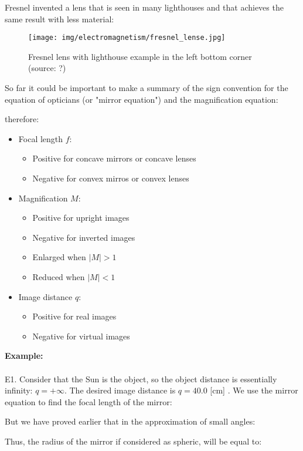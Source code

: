 	Fresnel invented a lens that is seen in many lighthouses and that achieves the same result with less material:	
	\begin{figure}[H]
		\centering
		\texttt{[image: img/electromagnetism/fresnel\_lense.jpg]}
		\caption{Fresnel lens with lighthouse example in the left bottom corner (source: ?)}
	\end{figure}
	\pagebreak
	So far it could be important to make a summary of the sign convention for the equation of opticians (or "mirror equation") and the magnification equation:
	
	therefore:
	\begin{itemize}
		\item Focal length $f$:
			\begin{itemize}
				\item Positive for concave mirrors or concave lenses
				\item Negative for convex mirros or convex lenses
			\end{itemize}
		\item Magnification $M$:
			\begin{itemize}
				\item Positive for upright images
				\item Negative for inverted images
				\item Enlarged when $|M|>1$
				\item Reduced when $|M|<1$
			\end{itemize}
		\item Image distance $q$:
			\begin{itemize}
				\item Positive for real images
				\item Negative for virtual images
			\end{itemize}
	\end{itemize}
	
	\begin{tcolorbox}[colframe=black,colback=white,sharp corners]
	\textbf{{\Large {}}Example:}\\\\
	E1. Consider that the Sun is the object, so the object distance is essentially infinity: $q=+\infty$. The desired image distance
is $q=40.0$ [cm] . We use the mirror equation to find the focal length of the mirror:
	
	But we have proved earlier that in the approximation of small angles:
	
	Thus, the radius of the mirror if considered as spheric, will be equal to:
	
	\end{tcolorbox}
	
